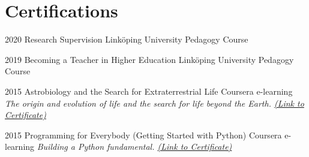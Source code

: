 \documentclass[]{friggeri-cv}
\begin{document}
\section{Certifications}
\begin{entrylist}

  \entry
    {2020}
    {Research Supervision}
    {Linköping University Pedagogy Course}
	
\entry
	{2019}
	{Becoming a Teacher in Higher Education }
	{Linköping University Pedagogy Course}	
    
 \entry
	{2015}
	{Astrobiology and the Search for Extraterrestrial Life}
	{Coursera e-learning}
	{\emph{The origin and evolution of life and the search for life beyond the Earth. \href{https://coursera.org/share/69979189b92c63a21c48390547f60df1}{(Link to Certificate)}}}
	
\entry
	{2015}
	{Programming for Everybody (Getting Started with Python)}
	{Coursera e-learning}
	{\emph{Building a Python fundamental. \href{https://coursera.org/share/69979189b92c63a21c48390547f60df1}{(Link to Certificate)}}}
	

\end{entrylist}
\end{document}
